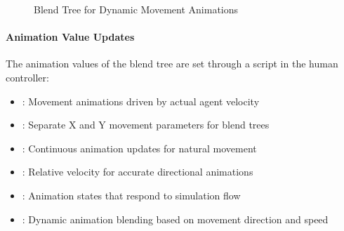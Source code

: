 \documentclass[letterpaper,10pt,english]{jupyterBook}
\begin{document}
\begin{figure}[htbp]
\centering
\capstart

\noindent{}
\caption{Blend Tree for Dynamic Movement Animations}\label{\detokenize{Human Agent:blend-tree}}\end{figure}


\paragraph{Animation Value Updates}
\label{\detokenize{Human Agent:animation-value-updates}}
\sphinxAtStartPar
The animation values of the blend tree are set through a script in the human controller:

\begin{sphinxVerbatim}[commandchars=\\\{\}]
\end{sphinxVerbatim}

\sphinxAtStartPar
{}
\begin{itemize}
\item {} 
\sphinxAtStartPar
{}: Movement animations driven by actual agent velocity

\item {} 
\sphinxAtStartPar
{}: Separate X and Y movement parameters for blend trees

\item {} 
\sphinxAtStartPar
{}: Continuous animation updates for natural movement

\item {} 
\sphinxAtStartPar
{}: Relative velocity for accurate directional animations

\item {} 
\sphinxAtStartPar
{}: Animation states that respond to simulation flow

\item {} 
\sphinxAtStartPar
{}: Dynamic animation blending based on movement direction and speed

\end{itemize}
\end{document}
